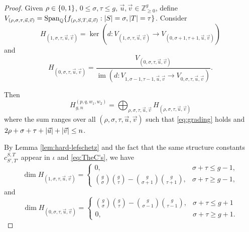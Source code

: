 \documentclass[11pt,reqno]{amsproc}
\numberwithin{equation}{section}
\theoremstyle{definition}
\theoremstyle{remark}
\newcommand\Z{{\mathbb Z}}
\newcommand\Q{{\mathbb Q}}
\DeclareMathOperator{\im}{im}
\DeclarePairedDelimiter{\abs}{\lvert}{\rvert}
\DeclarePairedDelimiter{\set}{\{}{\}}
\begin{document}
\begin{proof}

Given $\rho\in \set{0,1}$, $0\leq \sigma,\tau\leq g$, $\vec u,\vec v\in \Z_{\geq 0}^g$, define $V_{(\rho,\sigma,\tau,\vec u,\vec v)}=\mathrm{Span}_\Q\set{f_{(\rho,S,T,\vec u,\vec v)}: \abs{S}=\sigma, \abs{T}=\tau}$. Consider
\begin{equation}
    H_{(1,\sigma,\tau,\vec u,\vec v)}=\ker(d:V_{(1,\sigma,\tau,\vec u,\vec v)}\to V_{(0,\sigma+1,\tau+1,\vec u,\vec v)})
\end{equation}
and
\begin{equation}
    H_{(0,\sigma,\tau,\vec u,\vec v)}=\frac{V_{(0,\sigma,\tau,\vec u,\vec v)}}{\im(d:V_{1,\sigma-1,\tau-1,\vec u,\vec v}\to V_{0,\sigma,\tau,\vec u,\vec v})}.
\end{equation}

Then
\begin{equation}
    H_{g,n}^{(p,q,w_1,w_2)}=\bigoplus_{\rho,\sigma,\tau,\vec u,\vec v}H_{(\rho,\sigma,\tau,\vec u,\vec v)}
\end{equation}
where the sum ranges over all $(\rho,\sigma,\tau,\vec u,\vec v)$ such that \eqref{eq:grading} holds and $2\rho+\sigma+\tau+\abs{\vec u}+\abs{\vec v}\leq n$. 

By Lemma \ref{lem:hard-lefschetz} and the fact that the same structure constants $c^{S,T}_{S',T'}$ appear in $\iota$ and \eqref{eq:TheC's}, we have
\begin{equation}
    \dim H_{(1,\sigma,\tau,\vec u,\vec v)}=
    \begin{cases}
        0, & \sigma+\tau\leq g-1,\\
        \binom{g}{\sigma}\binom{g}{\tau}-\binom{g}{\sigma+1}\binom{g}{\tau+1}, & \sigma+\tau\geq g-1,
    \end{cases}
\end{equation}
and
\begin{equation}
    \dim H_{(0,\sigma,\tau,\vec u,\vec v)}=
    \begin{cases}
        \binom{g}{\sigma}\binom{g}{\tau}-\binom{g}{\sigma-1}\binom{g}{\tau-1}, & \sigma+\tau\leq g+1\\
        0, &\sigma+\tau\geq g+1.
    \end{cases}
\end{equation}


\end{proof}
\end{document}
